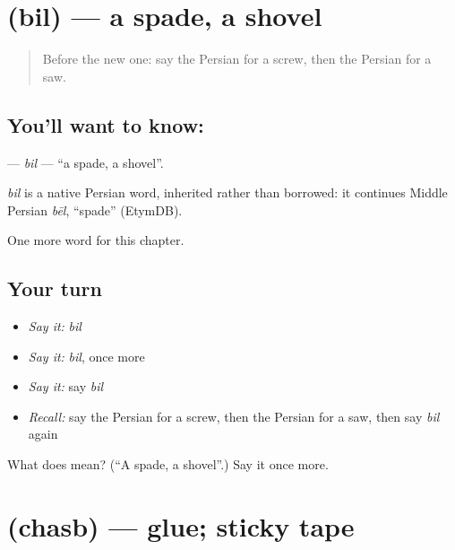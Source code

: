 \section[\texorpdfstring{\fa{بیل} (bil)}{بیل (bil)}]{ (bil) — a spade, a shovel}

\label{lesson:FA-C281-bil}



\begin{quote}
Before the new one: say the Persian for a screw, then the Persian for a saw.
\end{quote}

\subsection*{You'll want to know: }
\textbf{} — \emph{bil} — \textquotedblleft{}a spade, a shovel\textquotedblright{}.

\begin{cousinweb}
\emph{bil} is a native Persian word, inherited rather than borrowed: it continues Middle Persian \emph{bēl}, \textquotedblleft{}spade\textquotedblright{} (EtymDB).
\end{cousinweb}

\begin{grammarlens}[title={What you've built}]
One more word for this chapter.
\end{grammarlens}

\subsection*{Your turn}
\begin{itemize}
\raggedright
  \item \emph{Say it:} \emph{bil}
  \item \emph{Say it:} \emph{bil}, once more
  \item \emph{Say it:} say \emph{bil}
  \item \emph{Recall:} say the Persian for a screw, then the Persian for a saw, then say \emph{bil} again
\end{itemize}

\begin{tcolorbox}[breakable,colback=teal!4,colframe=teal!35!black,title={Before you move on}]
What does  mean? (\textquotedblleft{}A spade, a shovel\textquotedblright{}.) Say it once more.
\end{tcolorbox}
\section[\texorpdfstring{\fa{چسب} (chasb)}{چسب (chasb)}]{ (chasb) — glue; sticky tape}

